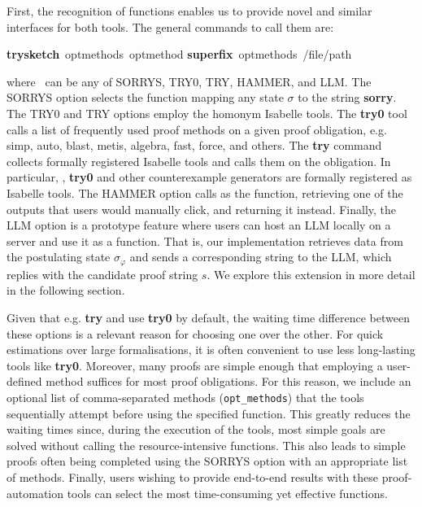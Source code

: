 \documentclass[10pt,conference]{IEEEtran}
\newcommand{\isakw}[1]{{\bfseries\ttfamily\def\isachardot{.}\def\isacharunderscore{\isacharunderscorekeyword}%
\def\isacharbraceleft{\{}\def\isacharbraceright{\}}#1}}
\renewcommand{\isacommand}[1]{\textcolor{IsaBlue}{\isakw{#1}}}
\begin{document}
First, the recognition of \frameterm functions enables us to provide novel and similar interfaces for both tools. The general commands to call them are:
\begin{isabellebody}
\isanewline
\isacommand{try{\isacharunderscore}sketch}\ \FRAMETERM{\isacharbrackleft}opt{\isacharunderscore}methods{\isacharbrackright}\ opt{\isacharunderscore}method
\isanewline
\isanewline
\isacommand{super{\isacharunderscore}fix}\ \FRAMETERM{\isacharbrackleft}opt{\isacharunderscore}methods{\isacharbrackright}\ {\isachardoublequoteopen}/file/path{\isachardoublequoteclose}
\isanewline
\end{isabellebody}
\noindent where \FRAMETERM\ can be any of SORRYS, TRY0, TRY, HAMMER, and LLM. The SORRYS option selects the \frameterm function mapping any state $\sigma$ to the string \isacommand{sorry}. The TRY0 and TRY options employ the homonym Isabelle tools. The \isacommand{try0} tool calls a list of frequently used proof methods on a given proof obligation, e.g. simp, auto, blast, metis, algebra, fast, force, and others. The \isacommand{try} command collects formally registered Isabelle tools and calls them on the obligation. In particular, \sledgehammer{}, \isacommand{try0} and other counterexample generators are formally registered as Isabelle tools. The HAMMER option calls \sledgehammer{} as the \frameterm function, retrieving one of the outputs that users would manually click, and returning it instead. Finally, the LLM option is a prototype feature where users can host an LLM locally on a server and use it as a \frameterm function. That is, our implementation retrieves data from the postulating state $\sigma_\varphi$ and sends a corresponding string to the LLM, which replies with the candidate proof string $s$. We explore this extension in more detail in the following section.

Given that e.g. \isacommand{try} and \sledgehammer{} use \isacommand{try0} by default, the waiting time difference between these \frameterm options is a relevant reason for choosing one over the other. For quick estimations over large formalisations, it is often convenient to use less long-lasting tools like \isacommand{try0}. Moreover, many proofs are simple enough that employing a user-defined method suffices for most proof obligations. For this reason, we include an optional list of comma-separated methods (\texttt{opt\_methods}) that the tools sequentially attempt before using the specified \frameterm function. This greatly reduces the waiting times since, during the execution of the tools, most simple goals are solved without calling the resource-intensive \frameterm functions. This also leads to simple proofs often being completed using the SORRYS option with an appropriate list of methods. Finally, users wishing to provide end-to-end results with these proof-automation tools can select the most time-consuming yet effective \frameterm functions.
\end{document}

